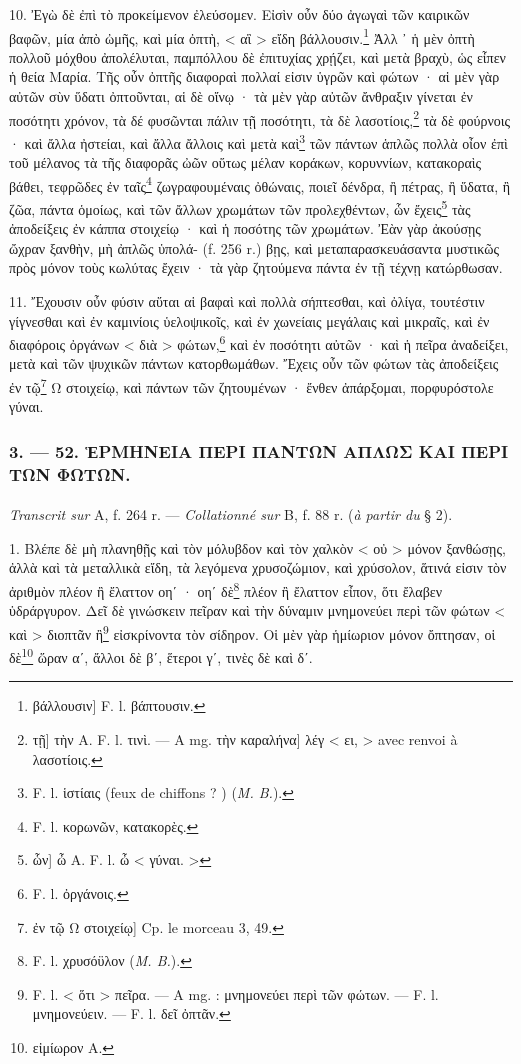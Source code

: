 \documentclass[a4paper, 11pt, oneside, polutonikogreek, french]{article}
\begin{document}
10. Ἐγὼ δὲ ἐπὶ τὸ προκείμενον ἐλεύσομεν. Εἰσὶν οὖν δύο ἀγωγαὶ τῶν καιρικῶν βαφῶν, μία ἀπὸ ὠμῆς, καὶ μία ὀπτὴ, < αἳ > εἴδη βάλλουσιν.\footnote{βάλλουσιν] F. l. βάπτουσιν.} Ἀλλ ᾽ ἡ μὲν ὀπτὴ πολλοῦ μόχθου ἀπολέλυται, παμπόλλου δὲ ἐπιτυχίας χρῄζει, καὶ μετὰ βραχὺ, ὡς εἶπεν ἡ θεία Μαρία. Τῆς οὖν ὀπτῆς διαφοραὶ πολλαί εἰσιν ὑγρῶν καὶ φώτων · αἱ μὲν γὰρ αὐτῶν σὺν ὕδατι ὀπτοῦνται, αἱ δὲ οἴνῳ · τὰ μὲν γὰρ αὐτῶν ἄνθραξιν γίνεται ἐν ποσότητι χρόνον, τὰ δέ φυσῶνται πάλιν τῇ ποσότητι, τὰ δὲ λασοτίοις,\footnote{τῇ] τὴν A. F. l. τινὶ. --- A mg. τὴν καραλήνα] λέγ < ει, > avec renvoi à λασοτίοις.} τὰ δὲ φούρνοις · καὶ ἄλλα ἠστείαι, καὶ ἄλλα ἄλλοις καὶ μετὰ καὶ\footnote{F. l. ἱστίαις (feux de chiffons ? ) (\emph{M. B.}).} τῶν πάντων ἁπλῶς πολλὰ οἶον ἐπὶ τοῦ μέλανος τὰ τῆς διαφορᾶς ὠῶν οὕτως μέλαν κοράκων, κορυννίων, κατακοραὶς βάθει, τεφρῶδες ἐν ταῖς\footnote{F. l. κορωνῶν, κατακορὲς.} ζωγραφουμέναις ὀθώναις, ποιεῖ δένδρα, ἢ πέτρας, ἢ ὕδατα, ἢ ζῶα, πάντα ὁμοίως, καὶ τῶν ἄλλων χρωμάτων τῶν προλεχθέντων, ὧν ἔχεις\footnote{ ὧν] ὦ A. F. l. ὦ < γύναι. >} τὰς ἀποδείξεις ἐν κάππα στοιχείῳ · καὶ ἡ ποσότης τῶν χρωμάτων. Ἐὰν γὰρ ἀκούσῃς ὤχραν ξανθὴν, μὴ ἀπλῶς ὑπολά- (f. 256 r.) βῃς, καὶ μεταπαρασκευάσαντα μυστικῶς πρὸς μόνον τοὺς κωλύτας ἔχειν · τὰ γὰρ ζητούμενα πάντα ἐν τῇ τέχνῃ κατώρθωσαν.

11. Ἔχουσιν οὖν φύσιν αὕται αἱ βαφαὶ καὶ πολλὰ σήπτεσθαι, καὶ ὀλίγα, τουτέστιν γίγνεσθαι καὶ ἐν καμινίοις ὑελοψικοῖς, καὶ ἐν χωνείαις μεγάλαις καὶ μικραῖς, καὶ ἐν διαφόροις ὀργάνων < διὰ > φώτων,\footnote{F. l. ὀργάνοις.} καὶ ἐν ποσότητι αὐτῶν · καὶ ἡ πεῖρα ἀναδείξει, μετὰ καὶ τῶν ψυχικῶν πάντων κατορθωμάθων. Ἔχεις οὖν τῶν φώτων τὰς ἀποδείξεις ἐν τῷ\footnote{ἐν τῷ Ω στοιχείῳ] Cp. le morceau 3, 49.} Ω στοιχείῳ, καὶ πάντων τῶν ζητουμένων · ἔνθεν ἀπάρξομαι, πορφυρόστολε γύναι.

\bigskip
\centerline{\EightStarTaper}
\centerline{\EightStarTaper\EightStarTaper}
\bigskip

\subsubsection{3. --- 52. ἙΡΜΗΝΕΙΑ ΠΕΡΙ ΠΑΝΤΩΝ ΑΠΛΩΣ ΚΑΙ ΠΕΡΙ ΤΩΝ ΦΩΤΩΝ.}
\paragraph{}
\emph{Transcrit sur} A, f. 264 r. --- \emph{Collationné sur} B, f. 88 r. (\emph{à partir du} § 2).

\bigskip

1. Βλέπε δὲ μὴ πλανηθῇς καὶ τὸν μόλυβδον καὶ τὸν χαλκὸν < οὐ > μόνον ξανθώσῃς, ἀλλὰ καὶ τὰ μεταλλικὰ εἴδη, τὰ λεγόμενα χρυσοζώμιον, καὶ χρύσολον, ἅτινά εἰσιν τὸν ἀριθμὸν πλέον ἢ ἔλαττον οηʹ · οηʹ δὲ\footnote{F. l. χρυσόϋλον (\emph{M. B.}).} πλέον ἢ ἔλαττον εἶπον, ὅτι ἔλαβεν ὑδράργυρον. Δεῖ δὲ γινώσκειν πεῖραν καὶ τὴν δύναμιν μνημονεύει περὶ τῶν φώτων < καὶ > διοπτᾶν ἢ\footnote{F. l. < ὅτι > πεῖρα. --- A mg. : μνημονεύει περὶ τῶν φώτων. --- F. l. μνημονεύειν. --- F. l. δεῖ ὀπτᾶν.} εἰσκρίνοντα τὸν σίδηρον. Οἱ μὲν γὰρ ἡμίωριον μόνον ὄπτησαν, οἱ δὲ\footnote{εἰμίωρον A.} ὥραν αʹ, ἄλλοι δὲ βʹ, ἕτεροι γʹ, τινὲς δὲ καὶ δʹ.
\end{document}
